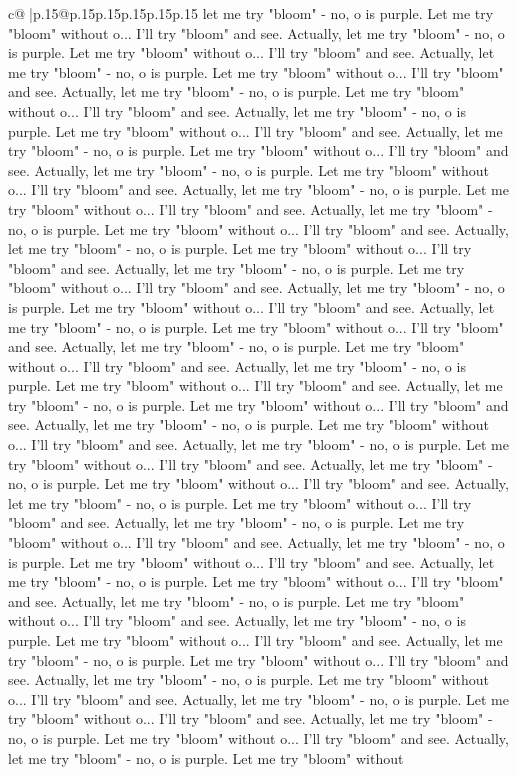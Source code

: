 \documentclass{article}
\begin{document}
{\begin{supertabular}{c@{$\;$}|p{.15\linewidth}@{}p{.15\linewidth}p{.15\linewidth}p{.15\linewidth}p{.15\linewidth}p{.15\linewidth}}
{{{let me try "bloom" {-} no, o is purple. Let me try "bloom" without o... I'll try "bloom" and see. Actually, let me try "bloom" {-} no, o is purple. Let me try "bloom" without o... I'll try "bloom" and see. Actually, let me try "bloom" {-} no, o is purple. Let me try "bloom" without o... I'll try "bloom" and see. Actually, let me try "bloom" {-} no, o is purple. Let me try "bloom" without o... I'll try "bloom" and see. Actually, let me try "bloom" {-} no, o is purple. Let me try "bloom" without o... I'll try "bloom" and see. Actually, let me try "bloom" {-} no, o is purple. Let me try "bloom" without o... I'll try "bloom" and see. Actually, let me try "bloom" {-} no, o is purple. Let me try "bloom" without o... I'll try "bloom" and see. Actually, let me try "bloom" {-} no, o is purple. Let me try "bloom" without o... I'll try "bloom" and see. Actually, let me try "bloom" {-} no, o is purple. Let me try "bloom" without o... I'll try "bloom" and see. Actually, let me try "bloom" {-} no, o is purple. Let me try "bloom" without o... I'll try "bloom" and see. Actually, let me try "bloom" {-} no, o is purple. Let me try "bloom" without o... I'll try "bloom" and see. Actually, let me try "bloom" {-} no, o is purple. Let me try "bloom" without o... I'll try "bloom" and see. Actually, let me try "bloom" {-} no, o is purple. Let me try "bloom" without o... I'll try "bloom" and see. Actually, let me try "bloom" {-} no, o is purple. Let me try "bloom" without o... I'll try "bloom" and see. Actually, let me try "bloom" {-} no, o is purple. Let me try "bloom" without o... I'll try "bloom" and see. Actually, let me try "bloom" {-} no, o is purple. Let me try "bloom" without o... I'll try "bloom" and see. Actually, let me try "bloom" {-} no, o is purple. Let me try "bloom" without o... I'll try "bloom" and see. Actually, let me try "bloom" {-} no, o is purple. Let me try "bloom" without o... I'll try "bloom" and see. Actually, let me try "bloom" {-} no, o is purple. Let me try "bloom" without o... I'll try "bloom" and see. Actually, let me try "bloom" {-} no, o is purple. Let me try "bloom" without o... I'll try "bloom" and see. Actually, let me try "bloom" {-} no, o is purple. Let me try "bloom" without o... I'll try "bloom" and see. Actually, let me try "bloom" {-} no, o is purple. Let me try "bloom" without o... I'll try "bloom" and see. Actually, let me try "bloom" {-} no, o is purple. Let me try "bloom" without o... I'll try "bloom" and see. Actually, let me try "bloom" {-} no, o is purple. Let me try "bloom" without o... I'll try "bloom" and see. Actually, let me try "bloom" {-} no, o is purple. Let me try "bloom" without o... I'll try "bloom" and see. Actually, let me try "bloom" {-} no, o is purple. Let me try "bloom" without o... I'll try "bloom" and see. Actually, let me try "bloom" {-} no, o is purple. Let me try "bloom" without o... I'll try "bloom" and see. Actually, let me try "bloom" {-} no, o is purple. Let me try "bloom" without o... I'll try "bloom" and see. Actually, let me try "bloom" {-} no, o is purple. Let me try "bloom" without o... I'll try "bloom" and see. Actually, let me try "bloom" {-} no, o is purple. Let me try "bloom" without }}}
\end{supertabular}}
\end{document}
